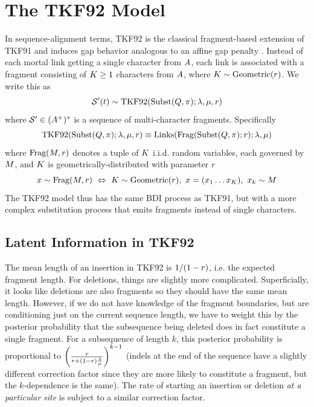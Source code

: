\section{The TKF92 Model}
\label{sec:tkf92}

In sequence-alignment terms, TKF92 is the classical fragment-based extension of TKF91 and induces gap behavior analogous to an affine gap penalty \cite{ThorneEtAl92}.
Instead of each mortal link getting a single character from $A$, each link is associated with a fragment consisting of $K \geq 1$ characters from $A$, where $K \sim {\mbox{Geometric}}(r)$.
We write this as
\[
\mathcal{S}'(t) \sim {\mbox{TKF92}}({\mbox{Subst}}(Q,\pi);\lambda,\mu,r)
\]
where $\mathcal{S}' \in (A^+)^\ast$ is a sequence of multi-character fragments.
Specifically
\[
{\mbox{TKF92}}({\mbox{Subst}}(Q,\pi);\lambda,\mu,r)
\equiv
{\mbox{Links}}({\mbox{Frag}}({\mbox{Subst}}(Q,\pi);r);\lambda,\mu)
\]
where ${\mbox{Frag}}(M,r)$ denotes a tuple of $K$ i.i.d. random variables, each governed by $M$,
and $K$ is geometrically-distributed with parameter $r$
\[
\state \sim \fragproc(\model,\ext)\ \Leftrightarrow\
\fraglen \sim \geomdist(\ext), \ \state = (x_1 \ldots x_\fraglen),\ x_\sumidx \sim\model
\]
The TKF92 model thus has the same BDI process as TKF91, but with a more complex substitution process that emits fragments instead of single characters.


\subsection{Latent Information in TKF92}

The mean length of an insertion in TKF92 is $1/(1-r)$, i.e. the expected fragment length.
For deletions, things are slightly more complicated. Superficially,
it looks like deletions are also fragments so they should have the same mean length.
However, if we do not have knowledge of the fragment boundaries,
but are conditioning just on the current sequence length,
we have to weight this by the posterior probability that the subsequence being deleted does in fact constitute a single fragment.
For a subsequence of length $k$, this posterior probability is proportional to
$\left(\frac{r}{r + (1-r)\frac{\lambda}{\mu}}\right)^{k-1}$
(indels at the end of the sequence have a slightly different correction factor
since they are more likely to constitute a fragment, but the $k$-dependence is the same).
The rate of starting an insertion or deletion {\em at a particular site}
is subject to a similar correction factor.

